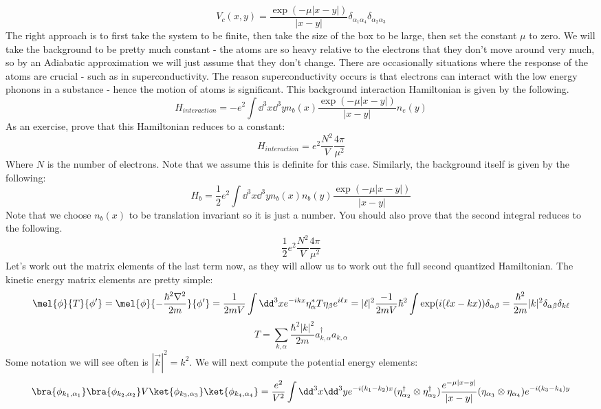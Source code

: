 \documentclass{article}
\begin{document}
\[V_c(x,y)=\frac{\exp(-\mu|x-y|)}{|x-y|}\delta_{\alpha_1\alpha_4}\delta_{\alpha_2\alpha_3}\]
The right approach is to first take the system to be finite, then take the size of the box to be large, then set the constant $\mu$ to zero. We will take the background to be pretty much constant - the atoms are so heavy relative to the electrons that they don't move around very much, so by an Adiabatic approximation we will just assume that they don't change. There are occasionally situations where the response of the atoms are crucial - such as in superconductivity. The reason superconductivity occurs is that electrons can interact with the low energy phonons in a substance - hence the motion of atoms is significant. This background interaction Hamiltonian is given by the following.
\begin{equation}
    H_{interaction} = -e^2 \int \dd^3 x \dd^3 y  n_b(x) \frac{\exp(-\mu|x-y|)}{|x-y|}n_e(y)
\end{equation}
As an exercise, prove that this Hamiltonian reduces to a constant:
\[H_{interaction} = e^2\frac{N^2}{V}\frac{4\pi}{\mu^2}\]
Where $N$ is the number of electrons. Note that we assume this is definite for this case. Similarly, the background itself is given by the following:
\begin{equation}
H_b = \frac{1}{2}e^2\int\dd^3 x \dd^3 y n_b(x) n_b(y)\frac{\exp(-\mu|x-y|)}{|x-y|}
\end{equation}
Note that we choose $n_b(x)$ to be translation invariant so it is just a number. You should also prove that the second integral reduces to the following.
\[\frac{1}{2}e^2 \frac{N^2}{V}\frac{4\pi}{\mu^2}\]
Let's work out the matrix elements of the last term now, as they will allow us to work out the full second quantized Hamiltonian. The kinetic energy matrix elements are pretty simple:
\[\mel{\phi}{T}{\phi'}=\mel{\phi}{-\frac{\hbar^2\nabla^2}{2m}}{\phi'} = \frac{1}{2mV}\int \dd^3 x e^{-ikx}\eta_\alpha^* T \eta_\beta e^{i\ell x} = |\ell|^2\frac{-1}{2mV}\hbar^2\int \exp(i(\ell x - kx))\delta_{\alpha \beta} = \frac{\hbar^2}{2m}|k|^2\delta_{\alpha \beta}\delta_{k \ell}\]
\begin{equation}
T =\sum_{k,\alpha} \frac{\hbar^2 |k|^2}{2m}a^\dagger_{k,\alpha}a_{k,\alpha}
\end{equation}
Some notation we will see often is $|\vec{k}|^2 = k^2$. We will next compute the potential energy elements:
\[\bra{\phi_{k_1,\alpha_1}}\bra{\phi_{k_2,\alpha_2}}V\ket{\phi_{k_3,\alpha_3}}\ket{\phi_{k_4,\alpha_4}}= \frac{e^2}{V^2}\int\dd^3 x\dd^3 y e^{-i(k_1-k_2)x}(\eta_{\alpha_2}^\dagger \otimes \eta_{\alpha_2}^\dagger)\frac{e^{-\mu|x-y|}}{|x-y|}(\eta_{\alpha_3}\otimes \eta_{\alpha_4})e^{-i(k_3-k_4)y}\]
\end{document}
